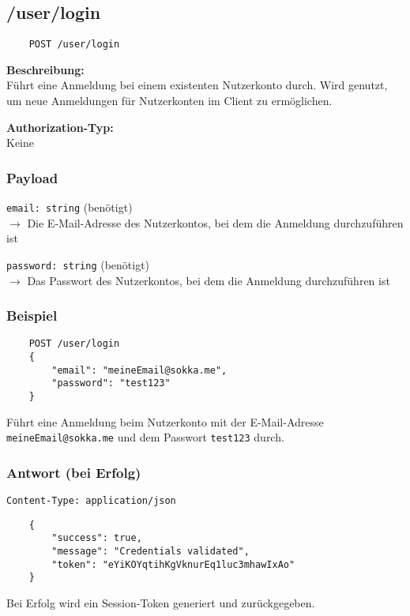 \subsection{/user/login}
\label{appauth}

\begin{lstlisting}
    POST /user/login
\end{lstlisting}

\textbf{Beschreibung:} \\
Führt eine Anmeldung bei einem existenten Nutzerkonto durch. Wird genutzt, um neue Anmeldungen für Nutzerkonten im Client zu ermöglichen.

\textbf{Authorization-Typ:} \\
Keine

\subsubsection{Payload}

\lstinline{email: string} (benötigt) \\
$\rightarrow$ Die E-Mail-Adresse des Nutzerkontos, bei dem die Anmeldung durchzuführen ist

\lstinline{password: string} (benötigt) \\
$\rightarrow$ Das Passwort des Nutzerkontos, bei dem die Anmeldung durchzuführen ist

\subsubsection{Beispiel}

\begin{lstlisting}
    POST /user/login
    {
        "email": "meineEmail@sokka.me",
        "password": "test123"
    }
\end{lstlisting}

Führt eine Anmeldung beim Nutzerkonto mit der E-Mail-Adresse \lstinline{meineEmail@sokka.me} und dem Passwort \lstinline{test123} durch.

\subsubsection{Antwort (bei Erfolg)}

\lstinline{Content-Type: application/json}
\begin{lstlisting}
    {
        "success": true, 
        "message": "Credentials validated",
        "token": "eYiKOYqtihKgVknurEq1luc3mhawIxAo"
    }
\end{lstlisting}

Bei Erfolg wird ein Session-Token generiert und zurückgegeben.